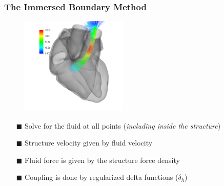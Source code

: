 \documentclass[8pt]{beamer}
\begin{document}
\begin{frame}
    \frametitle{The Immersed Boundary Method}
    \begin{figure}
        \centering
        \includegraphics[width=2in]{vel_streamlines_RV.png}
    \end{figure}
    \begin{itemize}
        \item[$\blacksquare$] Solve for the fluid at all points (\emph{including
        inside the structure})
        \item[$\blacksquare$] Structure velocity given by fluid velocity
        \item[$\blacksquare$] Fluid force is given by the structure force
        density
        \item[$\blacksquare$] Coupling is done by regularized delta functions
        (\(\delta_h\))
    \end{itemize}
\end{frame}
\end{document}
